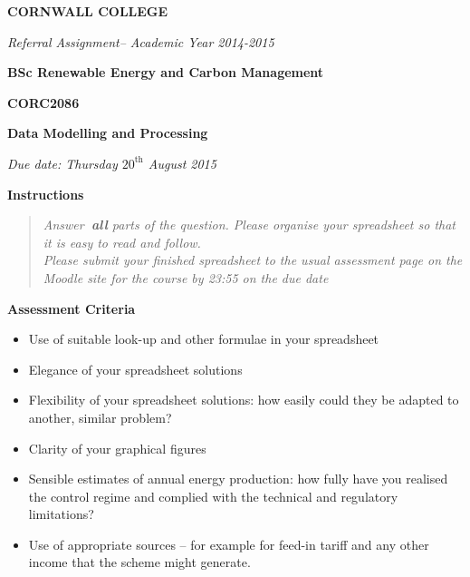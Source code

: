 \documentclass[a4paper,12pt,fleqn]{article}
\newcommand{\institution}{CORNWALL COLLEGE}
\newcommand{\titlehd}{BSc Renewable Energy and Carbon Management}
\newcommand{\examtype}{Referral Assignment}
\newcommand{\examdate}{Academic Year 2014-2015}
\newcommand{\examcode}{CORC2086}
\newcommand{\examtitle}{Data Modelling and Processing}
\newcommand{\duedate}{Thursday $20^{\mathrm{th}}$ August 2015}
\newcommand{\submission}{Please submit to the Assessment Moodle site by the due date}
\begin{document}

\begin{center}
\large\textbf{\institution}
\end{center}
\vspace{1cm}

\begin{center}
\textit{ \examtype -- \examdate}
\end{center}
\vspace{1cm}

\begin{center}
\large\textbf{\titlehd}
\end{center}

\begin{center}
\large\textbf{\examcode}
\end{center}
\begin{center}
\large\textbf{\examtitle}
\end{center}

\vspace{2 cm}

\begin{center}
\textit{Due date:  \duedate}
\end{center}


\vspace{2cm}

\textbf{Instructions}

\begin{quote}
\textit{Answer\textbf{\ all} parts of the question. Please organise your spreadsheet so that it is easy to read and follow.\\Please submit your finished  spreadsheet to the usual assessment page on the Moodle site for the course by 23:55 on the due date}
\end{quote}

\textbf{Assessment Criteria}

\begin{itemize}
\item Use of suitable look-up and other formulae in your spreadsheet
\item Elegance of your spreadsheet solutions
\item Flexibility of your spreadsheet solutions: how easily could they be adapted to another, similar problem?
\item Clarity of your graphical figures
\item Sensible estimates of annual energy production: how fully have you realised the control regime and complied with the technical and regulatory limitations?
\item Use of appropriate sources – for example for feed-in tariff and any other income that the scheme might generate. 
\end{itemize}
\end{document}
